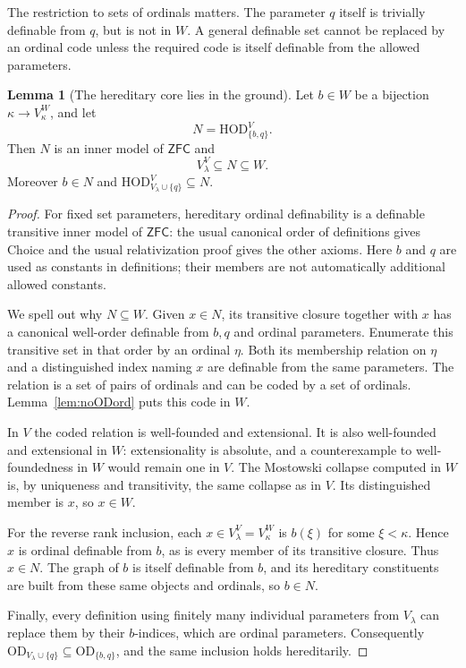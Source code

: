 \documentclass[11pt,letterpaper]{article}
\theoremstyle{definition}
\newtheorem{lemma}[definition]{Lemma}
\numberwithin{equation}{section}
\newcommand{\ZFC}{\mathsf{ZFC}}
\newcommand{\HOD}{\mathrm{HOD}}
\newcommand{\OD}{\mathrm{OD}}
\begin{document}
The restriction to sets of ordinals matters. The parameter $q$ itself is trivially definable from $q$, but is not in $W$. A general definable set cannot be replaced by an ordinal code unless the required code is itself definable from the allowed parameters.

\begin{lemma}[The hereditary core lies in the ground]\label{lem:HODground}
Let $b\in W$ be a bijection $\kappa\to V_\kappa^W$, and let
\[
 N=\HOD_{\{b,q\}}^V.
\]
Then $N$ is an inner model of $\ZFC$ and
\[
 V_\lambda^V\subseteq N\subseteq W.
\]
Moreover $b\in N$ and $\HOD_{V_\lambda\cup\{q\}}^V\subseteq N$.
\end{lemma}
\begin{proof}
For fixed set parameters, hereditary ordinal definability is a definable transitive inner model of $\ZFC$: the usual canonical order of definitions gives Choice and the usual relativization proof gives the other axioms. Here $b$ and $q$ are used as constants in definitions; their members are not automatically additional allowed constants.

We spell out why $N\subseteq W$. Given $x\in N$, its transitive closure together with $x$ has a canonical well-order definable from $b,q$ and ordinal parameters. Enumerate this transitive set in that order by an ordinal $\eta$. Both its membership relation on $\eta$ and a distinguished index naming $x$ are definable from the same parameters. The relation is a set of pairs of ordinals and can be coded by a set of ordinals. Lemma~\ref{lem:noODord} puts this code in $W$.

In $V$ the coded relation is well-founded and extensional. It is also well-founded and extensional in $W$: extensionality is absolute, and a counterexample to well-foundedness in $W$ would remain one in $V$. The Mostowski collapse computed in $W$ is, by uniqueness and transitivity, the same collapse as in $V$. Its distinguished member is $x$, so $x\in W$.

For the reverse rank inclusion, each $x\in V_\lambda^V=V_\kappa^W$ is $b(\xi)$ for some $\xi<\kappa$. Hence $x$ is ordinal definable from $b$, as is every member of its transitive closure. Thus $x\in N$. The graph of $b$ is itself definable from $b$, and its hereditary constituents are built from these same objects and ordinals, so $b\in N$.

Finally, every definition using finitely many individual parameters from $V_\lambda$ can replace them by their $b$-indices, which are ordinal parameters. Consequently $\OD_{V_\lambda\cup\{q\}}\subseteq\OD_{\{b,q\}}$, and the same inclusion holds hereditarily.
\end{proof}
\end{document}
